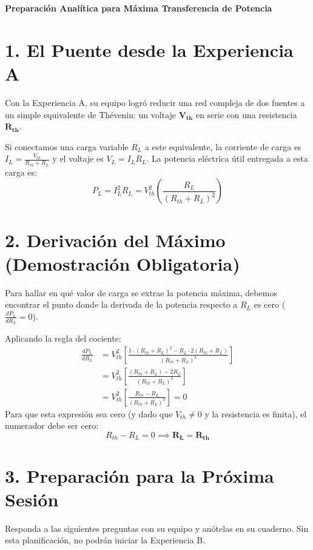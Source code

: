 \documentclass[11pt, a4paper]{article}
\begin{document}
\begin{tcolorbox}[colback=ucbblue!5!white, colframe=ucbblue, title=\textbf{Prelaboratorio Conceptual: Experiencia Integrada B}]
    \centering \textbf{Preparación Analítica para Máxima Transferencia de Potencia}
\end{tcolorbox}

\section*{1. El Puente desde la Experiencia A}
Con la Experiencia A, su equipo logró reducir una red compleja de dos fuentes a un simple equivalente de Thévenin: un voltaje $\bm{V_{th}}$ en serie con una resistencia $\bm{R_{th}}$.

Si conectamos una carga variable $R_L$ a este equivalente, la corriente de carga es $I_L = \frac{V_{th}}{R_{th} + R_L}$ y el voltaje es $V_L = I_L R_L$. La potencia eléctrica útil entregada a esta carga es:
\begin{equation*}
    P_L = I_L^2 R_L = V_{th}^2 \left( \frac{R_L}{(R_{th} + R_L)^2} \right)
\end{equation*}

\section*{2. Derivación del Máximo (Demostración Obligatoria)}
Para hallar en qué valor de carga se extrae la potencia máxima, debemos encontrar el punto donde la derivada de la potencia respecto a $R_L$ es cero ($\frac{dP_L}{dR_L} = 0$).

Aplicando la regla del cociente:
\begin{align*}
    \frac{dP_L}{dR_L} &= V_{th}^2 \left[ \frac{1 \cdot (R_{th} + R_L)^2 - R_L \cdot 2(R_{th} + R_L)}{(R_{th} + R_L)^4} \right] \\
    &= V_{th}^2 \left[ \frac{(R_{th} + R_L) - 2R_L}{(R_{th} + R_L)^3} \right] \\
    &= V_{th}^2 \left[ \frac{R_{th} - R_L}{(R_{th} + R_L)^3} \right] = 0
\end{align*}
Para que esta expresión sea cero (y dado que $V_{th} \neq 0$ y la resistencia es finita), el numerador debe ser cero:
\begin{equation*}
    R_{th} - R_L = 0 \implies \mathbf{R_L = R_{th}}
\end{equation*}

\section*{3. Preparación para la Próxima Sesión}
Responda a las siguientes preguntas con su equipo y anótelas en su cuaderno. Sin esta planificación, no podrán iniciar la Experiencia B.
\end{document}
